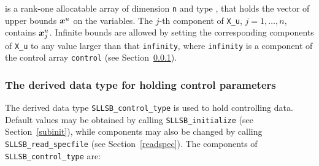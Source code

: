 \documentclass{galahad}
\newcommand{\packagename}{SLLSB}
\begin{document}
\begin{description}
 is a rank-one allocatable array of dimension {\tt n} and type
\realdp, that holds
the vector of upper bounds ${\bm{x}}^{u}$ on the variables.
The $j$-th component of {\tt X\_u}, $j = 1, \ldots , n$,
contains ${\bm{x}}_{j}^{u}$.
Infinite bounds are allowed by setting the corresponding
components of {\tt X\_u} to any value larger than that {\tt infinity},
where {\tt infinity} is a component of the control array {\tt control}
(see Section~\ref{typecontrol}).

\end{description}


\subsubsection{The derived data type for holding control
 parameters}\label{typecontrol}
The derived data type
{\tt \packagename\_control\_type}
is used to hold controlling data. Default values may be obtained by calling
{\tt \packagename\_initialize}
(see Section~\ref{subinit}),
while components may also be changed by calling
{\tt \packagename\_read\-\_specfile}
(see Section~\ref{readspec}).
The components of
{\tt \packagename\_control\_type}
are:
\end{document}
